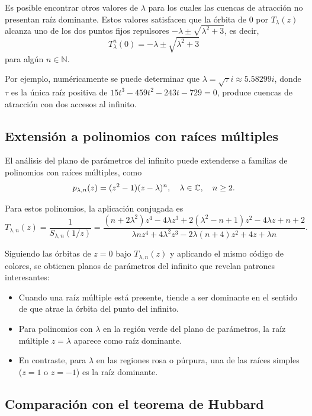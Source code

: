 Es posible encontrar otros valores de $\lambda$ para los cuales las cuencas de atracción no presentan raíz dominante. Estos valores satisfacen que la órbita de $0$ por $T_\lambda(z)$ alcanza uno de los dos puntos fijos repulsores $-\lambda\pm\sqrt{\lambda^2+3}$, es decir,
$$
T^n_\lambda(0)=-\lambda\pm\sqrt{\lambda^2+3}
$$
para algún $n\in\mathbb{N}$.

Por ejemplo, numéricamente se puede determinar que $\lambda=\sqrt{\tau}i\approx 5.58299i$, donde $\tau$ es la única raíz positiva de $15t^3-459t^2-243t-729=0$, produce cuencas de atracción con dos accesos al infinito.

\subsection{Extensión a polinomios con raíces múltiples}

El análisis del plano de parámetros del infinito puede extenderse a familias de polinomios con raíces múltiples, como
\begin{equation}
p_{\lambda,n}(z)=(z^2-1)(z-\lambda)^n, \quad \lambda\in\mathbb{C}, \quad n\ge 2.
\label{eq:familia_mult_inf}
\end{equation}

Para estos polinomios, la aplicación conjugada es
\begin{equation}
T_{\lambda,n}(z)=\frac{1}{S_{\lambda,n}(1/z)}=\frac{(n+2\lambda^2)z^4-4\lambda z^3+2(\lambda^2-n+1)z^2-4\lambda z+n+2}{\lambda n z^4+4\lambda^2 z^3-2\lambda(n+4)z^2+4z+\lambda n}.
\label{eq:T_lambda_n_inf}
\end{equation}

Siguiendo las órbitas de $z=0$ bajo $T_{\lambda,n}(z)$ y aplicando el mismo código de colores, se obtienen planos de parámetros del infinito que revelan patrones interesantes:

\begin{itemize}
\item Cuando una raíz múltiple está presente, tiende a ser dominante en el sentido de que atrae la órbita del punto del infinito.
\item Para polinomios con $\lambda$ en la región verde del plano de parámetros, la raíz múltiple $z=\lambda$ aparece como raíz dominante.
\item En contraste, para $\lambda$ en las regiones rosa o púrpura, una de las raíces simples ($z=1$ o $z=-1$) es la raíz dominante.
\end{itemize}

\subsection{Comparación con el teorema de Hubbard}

